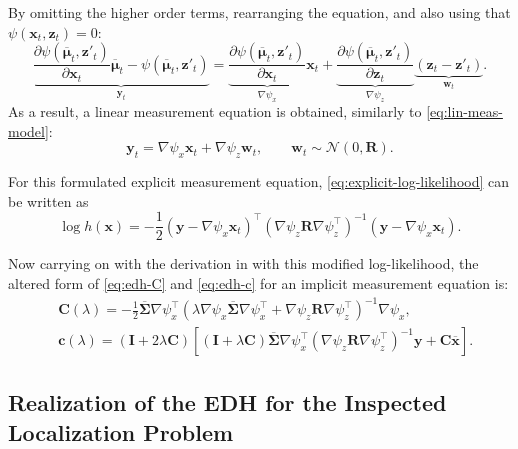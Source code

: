 By omitting the higher order terms, rearranging the equation, and also using that \linebreak
$\psi(\mathbf{x}_t,\mathbf{z}_t) = 0$:
\begin{equation}
    \underbrace{\frac{\partial \psi(\overline{\boldsymbol\mu}_t,\mathbf{z}'_t)}{\partial \mathbf{x}_t}\overline{\boldsymbol\mu}_t
        - \psi(\overline{\boldsymbol\mu}_t,\mathbf{z}'_t)}_{\mathbf{y}_t} = \underbrace{\frac{\partial \psi(\overline{\boldsymbol\mu}_t,\mathbf{z}'_t)}{\partial \mathbf{x}_t}}_{\nabla \psi_x}\mathbf{x}_t + \underbrace{\frac{\partial \psi(\overline{\boldsymbol\mu}_t,\mathbf{z}'_t)}{\partial \mathbf{z}_t}}_{\nabla \psi_z}\underbrace{(\mathbf{z}_t-\mathbf{z}'_t)}_{\mathbf{w}_t}.
\end{equation}
As a result, a linear measurement equation is obtained, similarly to \eqref{eq:lin-meas-model}:
\begin{equation}
    \mathbf{y}_t = \nabla \psi_x \mathbf{x}_t + \nabla \psi_z\mathbf{w}_t,\quad\quad \mathbf{w}_t \sim \mathcal{N}(0,\mathbf{R}).
\end{equation}

For this formulated explicit measurement equation, \eqref{eq:explicit-log-likelihood} can be written as
\begin{equation}
    \log h(\mathbf{x}) =-\frac{1}{2}(\mathbf{y}-\nabla \psi_x \mathbf{x}_t)^{\top} (\nabla \psi_z\mathbf{R}\nabla \psi_z^{\top})^{-1}(\mathbf{y}-\nabla \psi_x \mathbf{x}_t).
\end{equation}

Now carrying on with the derivation in \cite{Khan2018} with this modified log-likelihood,
the altered form of \eqref{eq:edh-C} and \eqref{eq:edh-c} for an implicit measurement
equation is:
\begin{align}
     & \mathbf{C}(\lambda) = -\frac{1}{2}\mathbf{\mathbf{\overline\Sigma}}\nabla \psi_x^\top\left(\lambda \nabla \psi_x\mathbf{\overline\Sigma}\nabla \psi_x^\top + \nabla \psi_z\mathbf{R}\nabla \psi_z^{\top}\right)^{-1}\nabla \psi_x,                              \\
     & \mathbf{c}(\lambda) = \left(\mathbf{I}+2\lambda\mathbf{C}\right)\left[\left(\mathbf{I}+\lambda\mathbf{C}\right)\mathbf{\overline\Sigma}\nabla \psi_x^\top(\nabla \psi_z\mathbf{R}\nabla \psi_z^{\top})^{-1}\mathbf{y} + \mathbf{C}\overline{\mathbf{x}}\right].
\end{align}
\subsection{Realization of the EDH for the Inspected Localization Problem}

